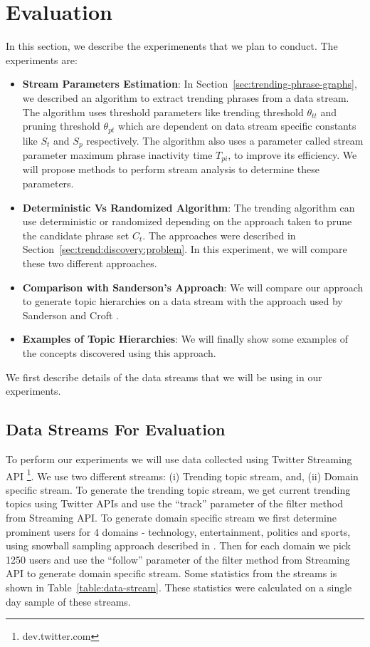 \documentclass{sig-alternate}
\begin{document}
\section{Evaluation}
\label{sec:experiments}
In this section, we describe the experimenents that we plan to conduct. The experiments are:
\begin{itemize}
\item \textbf{Stream Parameters Estimation}: In Section~\ref{sec:trending-phrase-graphs}, we described an algorithm to extract trending phrases from a data stream. The algorithm uses threshold parameters like trending threshold $\theta_{tt}$ and pruning threshold $\theta_{pt}$ which are dependent on data stream specific constants like $S_t$ and $S_p$ respectively. The algorithm also uses a parameter called stream parameter maximum phrase inactivity time $T_{pi}$, to improve its efficiency. We will propose methods to perform stream analysis to determine these parameters.
\item \textbf{Deterministic Vs Randomized Algorithm}: The trending algorithm can use deterministic or randomized depending on the approach taken to prune the candidate phrase set $C_t$. The approaches were described in Section~\ref{sec:trend:discovery:problem}. In this experiment, we will compare these two different approaches.
\item \textbf{Comparison with Sanderson's Approach}: We will compare our approach to generate topic hierarchies on a data stream with the approach used by Sanderson and Croft \cite{Sanderson:1999:derivingconcept}. 
\item \textbf{Examples of Topic Hierarchies}: We will finally show some examples of the concepts discovered using this approach.
\end{itemize}

We first describe details of the data streams that we will be using in our experiments.

\subsection{Data Streams For Evaluation}
\label{sec:data-stream}
To perform our experiments we will use data collected using Twitter Streaming API \footnote{dev.twitter.com}. We use two different streams: (i) Trending topic stream, and, (ii) Domain specific stream. To generate the trending topic stream, we get current trending topics using Twitter APIs  and use the ``track'' parameter of the filter method from Streaming API. To generate domain specific stream we first determine prominent users for $4$ domains - technology, entertainment, politics and sports, using snowball sampling approach described in \cite{Watts:2011:twitter}. Then for each domain we pick 1250 users and use the ``follow'' parameter of the filter method from Streaming API to generate domain specific stream. Some statistics from the streams is shown in Table~\ref{table:data-stream}. These statistics were calculated on a single day sample of these streams.
\end{document}
